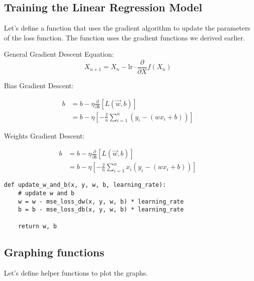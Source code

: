 \documentclass[openany]{book}
\begin{document}
    \subsection{Training the Linear Regression
Model}\label{training-the-linear-regression-model}

    Let's define a function that uses the gradient algorithm to update the
parameters of the loss function. The function uses the gradient
functions we derived earlier.

General Gradient Descent Equation:
\[
X_{n+1} = X_n - \text{lr} \cdot \frac{\partial}{\partial X} f(X_n)
\]

Bias Gradient Descent:

\begin{align*}
b &= b - \eta \frac{\partial}{\partial b} [L(\vec{w}, b)] \\
&= b - \eta [-\frac{2}{n} \sum_{i=1}^{n} (y_{i}-(w x_{i} + b))]
\end{align*}

    Weights Gradient Descent:

\begin{align*}
b &= b - \eta \frac{\partial}{\partial b} [L(\vec{w}, b)] \\
&= b - \eta [-\frac{2}{n} \sum_{i=1}^{n}x_{i}(y_{i}-(w x_{i} + b))]
\end{align*}

\begin{tcolorbox}
\tiny
\begin{verbatim}
def update_w_and_b(x, y, w, b, learning_rate):
    # update w and b
    w = w - mse_loss_dw(x, y, w, b) * learning_rate
    b = b - mse_loss_db(x, y, w, b) * learning_rate

    return w, b
\end{verbatim}
\end{tcolorbox}

    \subsection{Graphing functions}\label{graphing-functions}

Let's define helper functions to plot the graphs.
\end{document}
